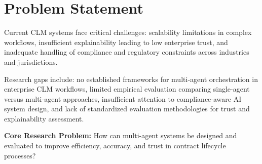 
\section{Problem Statement}\label{section:problem_statement}

Current CLM systems face critical challenges: scalability limitations in complex workflows, insufficient explainability leading to low enterprise trust, and inadequate handling of compliance and regulatory constraints across industries and jurisdictions.

Research gaps include: no established frameworks for multi-agent orchestration in enterprise CLM workflows, limited empirical evaluation comparing single-agent versus multi-agent approaches, insufficient attention to compliance-aware AI system design, and lack of standardized evaluation methodologies for trust and explainability assessment.

\textbf{Core Research Problem:} How can multi-agent systems be designed and evaluated to improve efficiency, accuracy, and trust in contract lifecycle processes?
